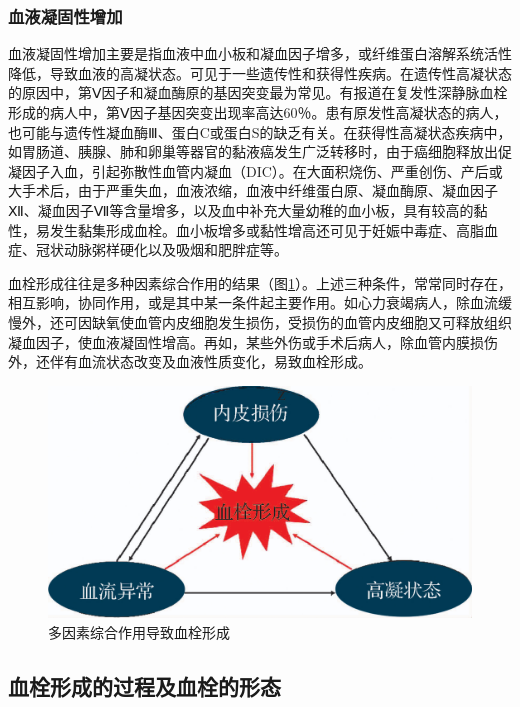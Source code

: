 \subsubsection{血液凝固性增加}

血液凝固性增加主要是指血液中血小板和凝血因子增多，或纤维蛋白溶解系统活性降低，导致血液的高凝状态。可见于一些遗传性和获得性疾病。在遗传性高凝状态的原因中，第Ⅴ因子和凝血酶原的基因突变最为常见。有报道在复发性深静脉血栓形成的病人中，第Ⅴ因子基因突变出现率高达60％。患有原发性高凝状态的病人，也可能与遗传性凝血酶Ⅲ、蛋白C或蛋白S的缺乏有关。在获得性高凝状态疾病中，如胃肠道、胰腺、肺和卵巢等器官的黏液癌发生广泛转移时，由于癌细胞释放出促凝因子入血，引起弥散性血管内凝血（DIC）。在大面积烧伤、严重创伤、产后或大手术后，由于严重失血，血液浓缩，血液中纤维蛋白原、凝血酶原、凝血因子Ⅻ、凝血因子Ⅶ等含量增多，以及血中补充大量幼稚的血小板，具有较高的黏性，易发生黏集形成血栓。血小板增多或黏性增高还可见于妊娠中毒症、高脂血症、冠状动脉粥样硬化以及吸烟和肥胖症等。

血栓形成往往是多种因素综合作用的结果（图\ref{fig3-5}）。上述三种条件，常常同时存在，相互影响，协同作用，或是其中某一条件起主要作用。如心力衰竭病人，除血流缓慢外，还可因缺氧使血管内皮细胞发生损伤，受损伤的血管内皮细胞又可释放组织凝血因子，使血液凝固性增高。再如，某些外伤或手术后病人，除血管内膜损伤外，还伴有血流状态改变及血液性质变化，易致血栓形成。

\begin{figure}[!htbp]
  \centering
  \includegraphics{./images/Image00038.jpg}
  \caption{多因素综合作用导致血栓形成}
  \label{fig3-5}
\end{figure}

\subsection{血栓形成的过程及血栓的形态}

